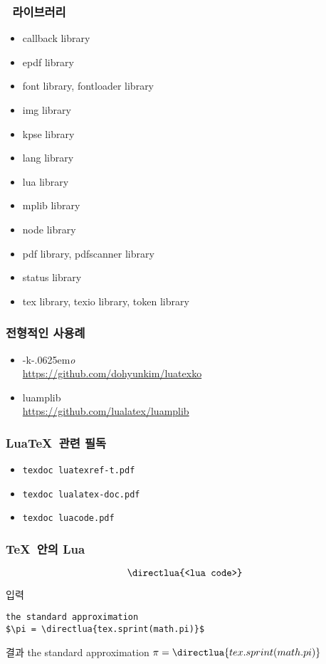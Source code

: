 \documentclass{beamer}
\def\luatex{\hologo{LuaTeX}}
\def\logoko{\textsf{k}\kern-.0625em\textit{o}}
\def\luatexko{\luatex-\logoko}
\begin{document}
%
\begin{frame}
  \frametitle{\luatex\ 라이브러리}
  \vspace{-3mm}
  \begin{itemize}
  \item callback library
  \item epdf library
  \item font library, fontloader library
  \item img library
  \item kpse library
  \item lang library
  \item lua library
  \item mplib library
  \item node library
  \item pdf library, pdfscanner library
  \item status library
  \item tex library, texio library, token library
  \end{itemize}
\end{frame}

%
\begin{frame}
  \frametitle{ 전형적인 사용례}
  \begin{itemize}
  \item \luatexko\\ \url{https://github.com/dohyunkim/luatexko}
  \item luamplib\\ \url{https://github.com/lualatex/luamplib}
  \end{itemize}
\end{frame}

%
\begin{frame}[fragile]
  \frametitle{Lua\TeX\ 관련 필독}
  \begin{itemize}
    \setlength\itemsep{1em}
  \item \texttt{texdoc luatexref-t.pdf}
  \item \texttt{texdoc lualatex-doc.pdf}
  \item \texttt{texdoc luacode.pdf}
  \end{itemize}
\end{frame}

%
\begin{frame}[fragile]
  \frametitle{\TeX\ 안의 Lua}
  \[\texttt{\string\directlua\{<lua code>\}}\]
  \begin{block}{입력}
\begin{verbatim}
the standard approximation 
$\pi = \directlua{tex.sprint(math.pi)}$
\end{verbatim}
  \end{block}
  \begin{block}{결과}
  the standard approximation $\pi = \directlua{tex.sprint(math.pi)}$
  \end{block}
\end{frame}
\end{document}
